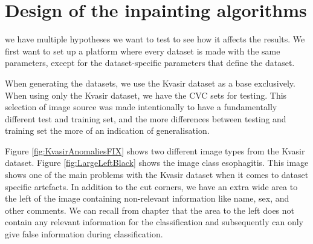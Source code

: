 \section{Design of the inpainting algorithms}
 we have multiple hypotheses we want to test to see how it affects the results. We first want to set up a platform where every dataset is made with the same parameters, except for the dataset-specific parameters that define the dataset. 

When generating the datasets, we use the Kvasir dataset as a base exclusively. When using only the Kvasir dataset, we have the CVC sets for testing. This selection of image source was made intentionally to have a fundamentally different test and training set, and the more differences between testing and training set the more of an indication of generalisation. 


Figure \ref{fig:KvasirAnomaliesFIX} shows two different image types from the Kvasir dataset. 
Figure \ref{fig:LargeLeftBlack} shows the image class esophagitis. This image shows one of the main problems with the Kvasir dataset when it comes to dataset specific artefacts. In addition to the cut corners, we have an extra wide area to the left of the image containing non-relevant information like name, sex, and other comments. We can recall from chapter  that the area to the left does not contain any relevant information for the classification and subsequently can only give false information during classification. 

